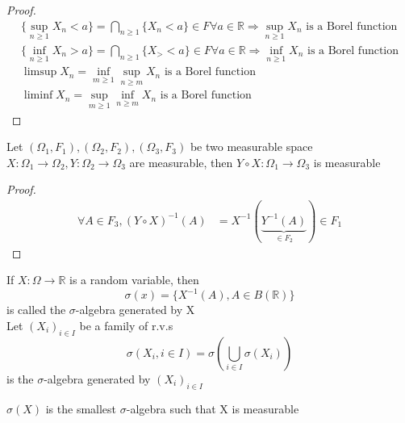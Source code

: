 \begin{proof}
    \begin{align*}{}{}
       \{ \sup_{n\geq1}X_n<a\}=\bigcap_{n\geq1}\{X_n<a\}\in F \forall a \in \mathbb{R} \Rightarrow \sup_{n\geq1}X_n \text{ is a Borel function}\\
       \{ \inf_{n\geq1}X_n>a\}=\bigcap_{n\geq1}\{X_><a\}\in F \forall a \in \mathbb{R} \Rightarrow \inf_{n\geq1}X_n \text{ is a Borel function}\\
       \limsup X_n=\inf_{m\geq1}\sup_{n\geq m}X_n \text{ is a Borel function}\\
         \liminf X_n=\sup_{m\geq1}\inf_{n\geq m}X_n \text{ is a Borel function}
    \end{align*}
\end{proof}
\begin{lemma}[]{}
    Let $ (\Omega_1, F_1),(\Omega_2, F_2),(\Omega_3, F_3) $ be two measurable space
\\$ X:\Omega_1\rightarrow\Omega_2,Y:\Omega_2\rightarrow\Omega_3 $ are measurable, then $ Y\circ X:\Omega_1\rightarrow\Omega_3 $ is measurable
\end{lemma}
\begin{proof}
    \begin{align*}{}{}
        \forall A\in F_3,(Y\circ X)^{-1}(A)&=X^{-1}(\underbrace{Y^{-1}(A)}_{\in F_2})\in F_1
    \end{align*}
\end{proof}
\begin{definition}{}
If $ X:\Omega\rightarrow\mathbb{R} $ is a random variable, then $$
    \sigma(x)=\{X^{-1}(A),A\in B(\mathbb{R})\}
$$ is called the $ \sigma $-algebra generated by X
\\Let $ (X_i)_{i\in I} $ be a family of r.v.s$$
    \sigma(X_i,i\in I)=\sigma(\bigcup_{i\in I}\sigma(X_i))$$ is the $ \sigma $-algebra generated by $ (X_i)_{i\in I }$
\end{definition}
\begin{remark}[]{}
$ \sigma(X) $ is the smallest $ \sigma $-algebra such that X is measurable
\end{remark}
